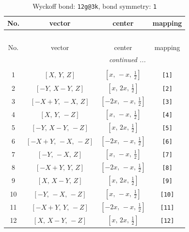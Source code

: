 \documentclass[fleqn,8pt]{jsarticle}
\begin{document}
\begin{longtable}{cccc}
\caption{Wyckoff bond: {\tt 12g@3k}, bond symmetry: {\tt 1}}
 \\
 \hline \hline
No. & vector & center & mapping \\ \hline \endfirsthead

\multicolumn{3}{l}{\tablename\ \thetable{}} \\
 \hline \hline
No. & vector & center & mapping \\ \hline \endhead

 \hline \hline
\multicolumn{3}{r}{\footnotesize\it continued ...} \\ \endfoot

 \hline \hline
\multicolumn{3}{r}{} \\ \endlastfoot

1 & $\left[ X,\, Y,\, Z \right]$ & $\left[ x,\, - x,\, \frac{1}{2} \right]$ & {\tt [1]} \\ \hline
2 & $\left[ - Y,\, X - Y,\, Z \right]$ & $\left[ x,\, 2 x,\, \frac{1}{2} \right]$ & {\tt [2]} \\ \hline
3 & $\left[ - X + Y,\, - X,\, Z \right]$ & $\left[ - 2 x,\, - x,\, \frac{1}{2} \right]$ & {\tt [3]} \\ \hline
4 & $\left[ X,\, Y,\, - Z \right]$ & $\left[ x,\, - x,\, \frac{1}{2} \right]$ & {\tt [4]} \\ \hline
5 & $\left[ - Y,\, X - Y,\, - Z \right]$ & $\left[ x,\, 2 x,\, \frac{1}{2} \right]$ & {\tt [5]} \\ \hline
6 & $\left[ - X + Y,\, - X,\, - Z \right]$ & $\left[ - 2 x,\, - x,\, \frac{1}{2} \right]$ & {\tt [6]} \\ \hline
7 & $\left[ - Y,\, - X,\, Z \right]$ & $\left[ x,\, - x,\, \frac{1}{2} \right]$ & {\tt [7]} \\ \hline
8 & $\left[ - X + Y,\, Y,\, Z \right]$ & $\left[ - 2 x,\, - x,\, \frac{1}{2} \right]$ & {\tt [8]} \\ \hline
9 & $\left[ X,\, X - Y,\, Z \right]$ & $\left[ x,\, 2 x,\, \frac{1}{2} \right]$ & {\tt [9]} \\ \hline
10 & $\left[ - Y,\, - X,\, - Z \right]$ & $\left[ x,\, - x,\, \frac{1}{2} \right]$ & {\tt [10]} \\ \hline
11 & $\left[ - X + Y,\, Y,\, - Z \right]$ & $\left[ - 2 x,\, - x,\, \frac{1}{2} \right]$ & {\tt [11]} \\ \hline
12 & $\left[ X,\, X - Y,\, - Z \right]$ & $\left[ x,\, 2 x,\, \frac{1}{2} \right]$ & {\tt [12]} \\
\end{longtable}
\end{document}
